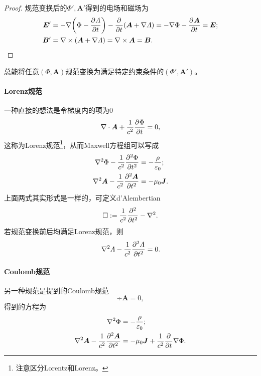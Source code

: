 \begin{proof}
    规范变换后的$\Phi',\bm A'$得到的电场和磁场为
    \begin{align*}
        \bm E' &= -\grad\biggp{\Phi - \pv\varLambda t} - \pp t(\bm A + \grad\varLambda) = -\grad\Phi - \pv{\bm A}t = \bm E;\\
        \bm B' &= \curl(\bm A + \grad\varLambda) = \curl\bm A = \bm B.
        \qedhere
    \end{align*}
\end{proof}

\begin{corollary}
    总能将任意$(\Phi,\bm A)$规范变换为满足特定约束条件的$(\Phi',\bm A')$。
\end{corollary}

\paragraph{Lorenz规范}

一种直接的想法是令梯度内的项为0
\begin{equation}
    \div\bm A + \frac1{c^2}\pv\Phi t = 0,
\end{equation}
这称为Lorenz规范\footnote{注意区分Lorentz和Lorenz。}，从而Maxwell方程组可以写成
\begin{subequations}
    \begin{align}
        \laplacian\Phi - \frac1{c^2}\pv[2]\Phi t &= -\frac\rho{\varepsilon_0};\\
        \laplacian\bm A - \frac1{c^2}\pv[2]{\bm A}t &= -\mu_0\bm J.
    \end{align}
\end{subequations}
上面两式其实形式是一样的，可定义d'Alembertian%
\begin{equation}
    \square := \frac1{c^2}\pp[2]t - \laplacian.
\end{equation}
若规范变换前后均满足Lorenz规范，则
\begin{equation}
    \laplacian\varLambda - \frac1{c^2}\pv[2]\varLambda t = 0.
\end{equation}
\paragraph{Coulomb规范}
另一种规范是提到的Coulomb规范
\begin{equation}
    \label{eq:ed-coulomb-gauge}
    \div\bm A = 0,
\end{equation}
得到的方程为
\begin{subequations}
    \begin{align}
        \label{eqn:Coulomb gauge Phi}
        \laplacian\Phi &= -\frac\rho{\varepsilon_0};\\
        \label{eqn:Coulomb gauge A}
        \laplacian\bm A - \frac1{c^2}\pv[2]{\bm A}t &= -\mu_0\bm J + \frac1{c^2}\pp t\grad\Phi.
    \end{align}
\end{subequations}

